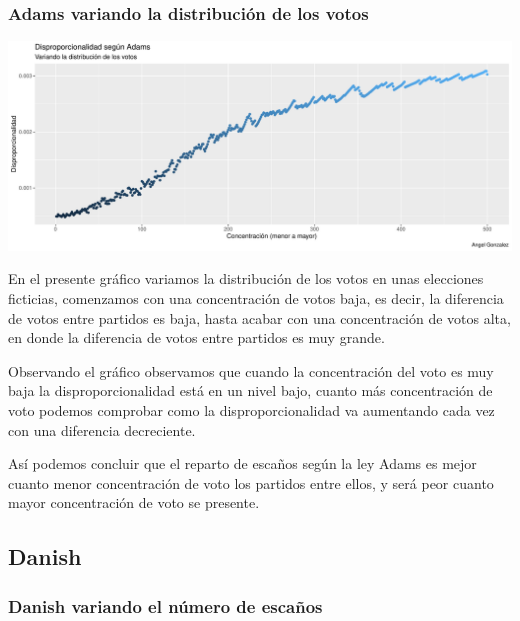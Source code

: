 \documentclass[12pt,a4paper,]{book}
\numberwithin{dummy}{section}
\theoremstyle{ocrenumbox}
\theoremstyle{blacknumex}
\theoremstyle{blacknumbox}
\theoremstyle{ocrenum}
\theoremstyle{ocrenum}
\begin{document}
\hypertarget{adams-variando-la-distribuciuxf3n-de-los-votos}{%
\subsubsection{Adams variando la distribución de los
votos}\label{adams-variando-la-distribuciuxf3n-de-los-votos}}

\begin{center}\includegraphics[width=0.95\linewidth]{figurasR/unnamed-chunk-36-1} \end{center}

En el presente gráfico variamos la distribución de los votos en unas
elecciones ficticias, comenzamos con una concentración de votos baja, es
decir, la diferencia de votos entre partidos es baja, hasta acabar con
una concentración de votos alta, en donde la diferencia de votos entre
partidos es muy grande.

Observando el gráfico observamos que cuando la concentración del voto es
muy baja la disproporcionalidad está en un nivel bajo, cuanto más
concentración de voto podemos comprobar como la disproporcionalidad va
aumentando cada vez con una diferencia decreciente.

Así podemos concluir que el reparto de escaños según la ley Adams es
mejor cuanto menor concentración de voto los partidos entre ellos, y
será peor cuanto mayor concentración de voto se presente.

\hypertarget{danish}{%
\subsection{Danish}\label{danish}}

\hypertarget{danish-variando-el-nuxfamero-de-escauxf1os}{%
\subsubsection{Danish variando el número de
escaños}\label{danish-variando-el-nuxfamero-de-escauxf1os}}
\end{document}
